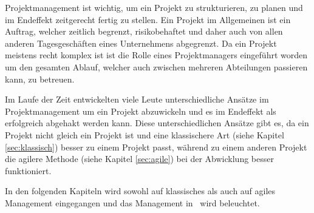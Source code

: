 
Projektmanagement ist wichtig, um ein Projekt zu strukturieren, zu planen und im Endeffekt zeitgerecht fertig zu stellen. Ein Projekt im Allgemeinen ist ein Auftrag, welcher zeitlich begrenzt, risikobehaftet und daher auch von allen anderen Tagesgeschäften eines Unternehmens abgegrenzt. Da ein Projekt meistens recht komplex ist ist die Rolle eines Projektmanagers eingeführt worden um den gesamten Ablauf, welcher auch zwischen mehreren Abteilungen passieren kann, zu betreuen. \cite{Projectman.}

Im Laufe der Zeit entwickelten viele Leute unterschiedliche Ansätze im Projektmanagement um ein Projekt abzuwickeln und es im Endeffekt als erfolgreich abgehakt werden kann. Diese unterschiedlichen Ansätze gibt es, da ein Projekt nicht gleich ein Projekt ist und eine klassischere Art (siehe Kapitel \ref{sec:klassisch}) besser zu einem Projekt passt, während zu einem anderen Projekt die agilere Methode (siehe Kapitel \ref{sec:agile}) bei der Abwicklung besser funktioniert. \cite{Projectman.}

In den folgenden Kapiteln wird sowohl auf klassisches als auch auf agiles Management eingegangen und das Management in \ZELIA\ wird beleuchtet. \cite{Projectman.}


